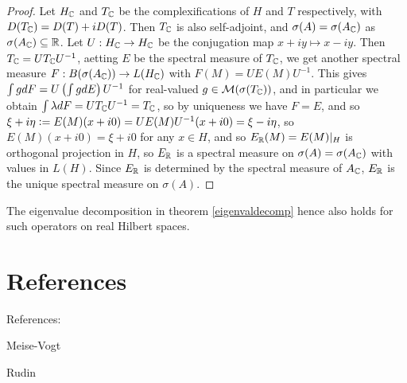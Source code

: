 \documentclass[10pt]{amsart}
\begin{document}
\begin{proof}
    Let $H_{\mathbb{C}}$ and $T_{\mathbb{C}}$ be the complexifications of $H$ and $T$ respectively, with $D(T_{\mathbb{C}}) = D(T) + iD(T)$. Then $T_{\mathbb{C}}$ is also self-adjoint, and $\sigma(A) = \sigma(A_{\mathbb{C}})$ as $\sigma(A_{\mathbb{C}}) \subseteq \mathbb{R}$. Let $U : H_{\mathbb{C}} \to H_{\mathbb{C}}$ be the conjugation map $x + iy \mapsto x - iy$. Then $T_{\mathbb{C}} = UT_{\mathbb{C}} U^{-1}$, aetting $E$ be the spectral measure of $T_{\mathbb{C}}$, we get another spectral measure $F : B(\sigma(A_{\mathbb{C}})) \to L(H_{\mathbb{C}})$ with $F(M) = UE(M)U^{-1}$. This gives $\int g dF = U\left(  \int g dE  \right)U^{-1}$ for real-valued $g \in \mathcal{M}(\sigma(T_{\mathbb{C}}))$, and in particular we obtain $\int \lambda dF = UT_{\mathbb{C}} U^{-1} = T_{\mathbb{C}}$, so by uniqueness we have $F = E$, and so $\xi + i \eta \vcentcolon= E(M)(x + i0) = UE(M)U^{-1}(x + i0) = \xi - i \eta$, so $E(M)(x + i0) = \xi + i0$ for any $x \in H$, and so $E_{\mathbb{R}}(M) = E(M)|_H$ is orthogonal projection in $H$, so $E_{\mathbb{R}}$ is a spectral measure on $\sigma(A) = \sigma(A_{\mathbb{C}})$ with values in $L(H)$. Since $E_{\mathbb{R}}$ is determined by the spectral measure of $A_{\mathbb{C}}$, $E_{\mathbb{R}}$ is the unique spectral measure on $\sigma(A)$.
\end{proof} %
The eigenvalue decomposition in theorem \ref{eigenvaldecomp} hence also holds for such operators on real Hilbert spaces.









\section{References}
References:

Meise-Vogt

Rudin
\end{document}
